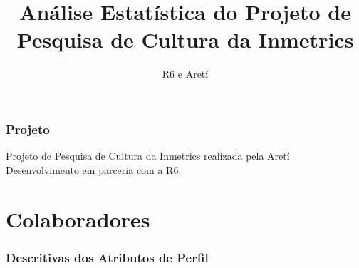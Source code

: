 \documentclass[]{article}
\title{Análise Estatística do Projeto de Pesquisa de Cultura da Inmetrics}
\author{R6 e Aretí}
\date{}
\begin{document}
\maketitle

{
\setcounter{tocdepth}{1}
\tableofcontents
}
\hypertarget{projeto}{%
\section{Projeto}\label{projeto}}

Projeto de Pesquisa de Cultura da Inmetrics realizada pela Aretí Desenvolvimento em parceria com a R6.

\hypertarget{part-colaboradores}{%
\part{Colaboradores}\label{part-colaboradores}}

\hypertarget{descritivas-dos-atributos-de-perfil}{%
\section{Descritivas dos Atributos de Perfil}\label{descritivas-dos-atributos-de-perfil}}
\end{document}
